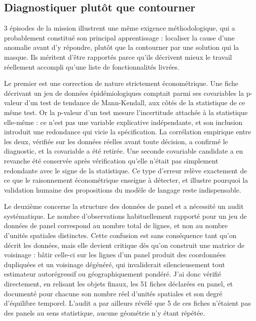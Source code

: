 \documentclass[11pt,a4paper]{article}
\begin{document}
\subsection{Diagnostiquer plutôt que contourner}

3 épisodes de la mission illustrent une même exigence méthodologique, qui a probablement constitué son principal apprentissage : localiser la cause d'une anomalie avant d'y répondre, plutôt que la contourner par une solution qui la masque. Ils méritent d'être rapportés parce qu'ils décrivent mieux le travail réellement accompli qu'une liste de fonctionnalités livrées.

Le premier est une correction de nature strictement économétrique. Une fiche décrivant un jeu de données épidémiologiques comptait parmi ses covariables la p-valeur d'un test de tendance de Mann-Kendall, aux côtés de la statistique de ce même test. Or la p-valeur d'un test mesure l'incertitude attachée à la statistique elle-même : ce n'est pas une variable explicative indépendante, et son inclusion introduit une redondance qui vicie la spécification. La corrélation empirique entre les deux, vérifiée sur les données réelles avant toute décision, a confirmé le diagnostic, et la covariable a été retirée. Une seconde covariable candidate a en revanche été conservée après vérification qu'elle n'était pas simplement redondante avec le signe de la statistique. Ce type d'erreur relève exactement de ce que le raisonnement économétrique enseigne à détecter, et illustre pourquoi la validation humaine des propositions du modèle de langage reste indispensable.

Le deuxième concerne la structure des données de panel et a nécessité un audit systématique. Le nombre d'observations habituellement rapporté pour un jeu de données de panel correspond au nombre total de lignes, et non au nombre d'unités spatiales distinctes. Cette confusion est sans conséquence tant qu'on décrit les données, mais elle devient critique dès qu'on construit une matrice de voisinage : bâtir celle-ci sur les lignes d'un panel produit des coordonnées dupliquées et un voisinage dégénéré, qui invaliderait silencieusement tout estimateur autorégressif ou géographiquement pondéré. J'ai donc vérifié directement, en relisant les objets finaux, les 51 fiches déclarées en panel, et documenté pour chacune son nombre réel d'unités spatiales et son degré d'équilibre temporel. L'audit a par ailleurs révélé que 5 de ces fiches n'étaient pas des panels au sens statistique, aucune géométrie n'y étant répétée.
\end{document}
